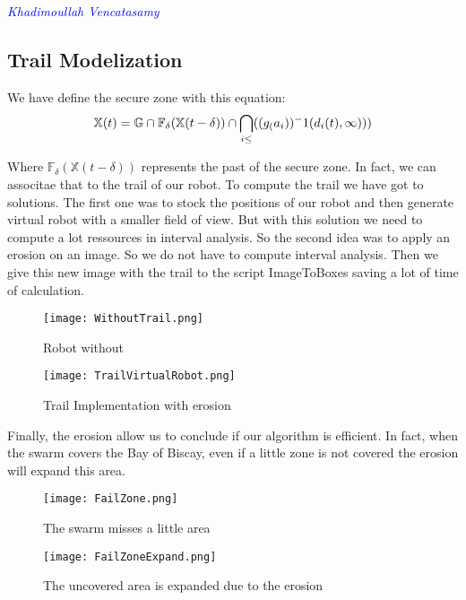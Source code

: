 \vspace{0.5 cm}
\textcolor{blue} {\textit{Khadimoullah Vencatasamy}}
\vspace{0.3 cm}
\subsection{Trail Modelization}

We have define the secure zone with this equation:\\
\begin{equation}
\mathbb{X}(t)=\mathbb{G}\cap\mathbb{F}_\delta(\mathbb{X}(t-\delta))\cap\bigcap\limits_{i \leq}((g_(a_i))^-1(d_i(t),\infty)))\\
\end{equation}

Where $\mathbb{F}_\delta(\mathbb{X}(t-\delta))$ represents the past of the secure zone. In fact, we can associtae that to the trail of our robot. 
To compute the trail we have got to solutions. The first one was to stock the positions of our robot and then generate virtual robot with a smaller field of view. But with this solution we need to compute a lot ressources in interval analysis. So the second idea was to apply an erosion on an image. So we do not have to compute interval analysis. Then we give this new image with the trail to the script ImageToBoxes saving a lot of time of calculation.

\begin{figure}[H]
\begin{center}
  \texttt{[image: WithoutTrail.png]}
  \caption{Robot without}
\end{center}
\end{figure}


\begin{figure}
\begin{center}
  \texttt{[image: TrailVirtualRobot.png]}
  \caption{Trail Implementation with erosion}
\end{center}
\end{figure}

Finally, the erosion allow us to conclude if our algorithm is efficient. In fact, when the swarm covers the Bay of Biscay, even if a little zone is not covered the erosion will expand this area.

\begin{figure}[H]
\begin{center}
  \texttt{[image: FailZone.png]}
  \caption{The swarm misses a little area}
\end{center}
\end{figure}

\begin{figure}
\begin{center}
  \texttt{[image: FailZoneExpand.png]}
  \caption{The uncovered area is expanded due to the erosion}
\end{center}
\end{figure}

